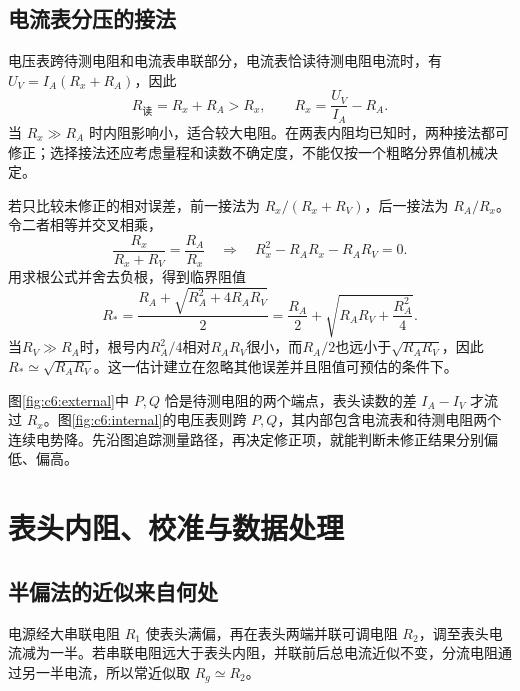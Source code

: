 \subsection{电流表分压的接法}

电压表跨待测电阻和电流表串联部分，电流表恰读待测电阻电流时，有 $U_V=I_A(R_x+R_A)$，因此
\[
 R_{\text{读}}=R_x+R_A>R_x,\qquad R_x=\frac{U_V}{I_A}-R_A.
\]
当 $R_x\gg R_A$ 时内阻影响小，适合较大电阻。在两表内阻均已知时，两种接法都可修正；选择接法还应考虑量程和读数不确定度，不能仅按一个粗略分界值机械决定。

若只比较未修正的相对误差，前一接法为 $R_x/(R_x+R_V)$，后一接法为 $R_A/R_x$。令二者相等并交叉相乘，
\[
\frac{R_x}{R_x+R_V}=\frac{R_A}{R_x}
\quad\Longrightarrow\quad
R_x^2-R_AR_x-R_AR_V=0.
\]
用求根公式并舍去负根，得到临界阻值
\[
R_*=\frac{R_A+\sqrt{R_A^2+4R_AR_V}}2
=\frac{R_A}{2}+\sqrt{R_AR_V+\frac{R_A^2}{4}}.
\]
当$R_V\gg R_A$时，根号内$R_A^2/4$相对$R_AR_V$很小，而$R_A/2$也远小于$\sqrt{R_AR_V}$，因此$R_*\simeq\sqrt{R_AR_V}$。这一估计建立在忽略其他误差并且阻值可预估的条件下。



图\ref{fig:c6:external}中 $P,Q$ 恰是待测电阻的两个端点，表头读数的差 $I_A-I_V$ 才流过 $R_x$。图\ref{fig:c6:internal}的电压表则跨 $P,Q$，其内部包含电流表和待测电阻两个连续电势降。先沿图追踪测量路径，再决定修正项，就能判断未修正结果分别偏低、偏高。


\section{表头内阻、校准与数据处理}
\subsection{半偏法的近似来自何处}

电源经大串联电阻 $R_1$ 使表头满偏，再在表头两端并联可调电阻 $R_2$，调至表头电流减为一半。若串联电阻远大于表头内阻，并联前后总电流近似不变，分流电阻通过另一半电流，所以常近似取 $R_g\simeq R_2$。

